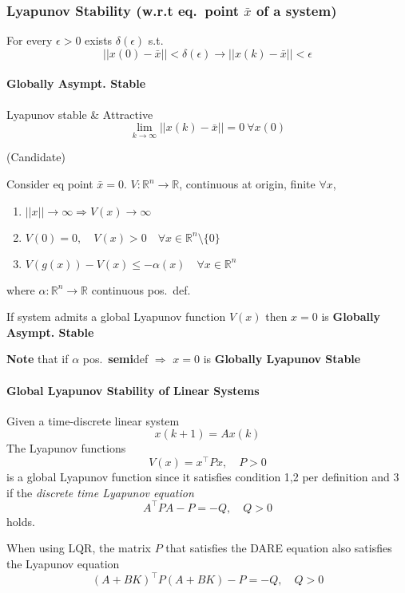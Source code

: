 \subsubsection[Lyapunov Stability]{Lyapunov Stability (w.r.t \textbf{eq.\ point} $\bar{x}$ of a system)}


For every $\epsilon>0$ exists $\delta(\epsilon)$ s.t.\
\noindent\begin{equation*}
    \lvert\lvert x(0) - \bar{x} \rvert\rvert < \delta(\epsilon) \to
    \lvert\lvert x(k) - \bar{x} \rvert\rvert < \epsilon
\end{equation*}

\paragraph{Globally Asympt. Stable}
Lyapunov stable \& Attractive
\noindent\begin{equation*}
    \lim_{k\to\infty} \lvert\lvert x(k) - \bar{x} \rvert\rvert = 0 \ \forall x(0)
\end{equation*}

\newpar{}
 (Candidate)

Consider eq point $\bar{x}=0$. $V:\mathbb{R}^n\to \mathbb{R}$, continuous at origin, finite $\forall x$,
\begin{enumerate}
    \item $\lvert\lvert x \rvert\rvert \to \infty \Rightarrow V(x) \to \infty$
    \item $V(0)=0, \quad V(x)>0 \quad \forall x \in \mathbb{R}^n \setminus\{0\}$
    \item $V(g(x)) - V(x) \leq -\alpha(x) \quad \forall x \in \mathbb{R}^n$
\end{enumerate}
where $\alpha:\mathbb{R}^n\to \mathbb{R}$ continuous pos.\ def.

\newpar{}

If system admits a global Lyapunov function $V(x)$ then $x=0$ is \textbf{Globally Asympt. Stable}

\newpar{}
\textbf{Note} that if $\alpha$ pos.\ \textbf{semi}def $\Rightarrow$ $x=0$ is \textbf{Globally Lyapunov Stable}

\paragraph{Global Lyapunov Stability of Linear Systems}
Given a time-discrete linear system 
\noindent\begin{equation*}
    x(k+1) = Ax(k)
\end{equation*}
The Lyapunov functions 
\noindent\begin{equation*}
    V(x) = x^\top P x, \quad P>0
\end{equation*}
is a global Lyapunov function since it satisfies condition 1,2 per definition and 3 if the \textit{discrete time Lyapunov equation}
\noindent\begin{equation*}
    A^\top PA -P = -Q, \quad Q>0
\end{equation*}
holds.

\newpar{}
When using LQR, the matrix $P$ that satisfies the DARE equation also satisfies the Lyapunov equation
\noindent\begin{equation*}
    {(A+BK)}^\top P{(A+BK)} -P = -Q, \quad Q>0
\end{equation*}
